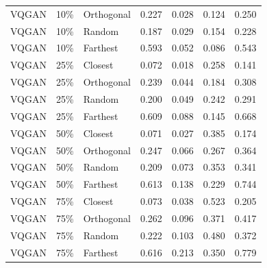 \begin{longtable}{lllrrrr}
VQGAN & 10\% & Orthogonal & 0.227 & 0.028 & 0.124 & 0.250 \\
VQGAN & 10\% & Random & 0.187 & 0.029 & 0.154 & 0.228 \\
VQGAN & 10\% & Farthest & 0.593 & 0.052 & 0.086 & 0.543 \\
VQGAN & 25\% & Closest & 0.072 & 0.018 & 0.258 & 0.141 \\
VQGAN & 25\% & Orthogonal & 0.239 & 0.044 & 0.184 & 0.308 \\
VQGAN & 25\% & Random & 0.200 & 0.049 & 0.242 & 0.291 \\
VQGAN & 25\% & Farthest & 0.609 & 0.088 & 0.145 & 0.668 \\
VQGAN & 50\% & Closest & 0.071 & 0.027 & 0.385 & 0.174 \\
VQGAN & 50\% & Orthogonal & 0.247 & 0.066 & 0.267 & 0.364 \\
VQGAN & 50\% & Random & 0.209 & 0.073 & 0.353 & 0.341 \\
VQGAN & 50\% & Farthest & 0.613 & 0.138 & 0.229 & 0.744 \\
VQGAN & 75\% & Closest & 0.073 & 0.038 & 0.523 & 0.205 \\
VQGAN & 75\% & Orthogonal & 0.262 & 0.096 & 0.371 & 0.417 \\
VQGAN & 75\% & Random & 0.222 & 0.103 & 0.480 & 0.372 \\
VQGAN & 75\% & Farthest & 0.616 & 0.213 & 0.350 & 0.779 \\
\end{longtable}
\endgroup

